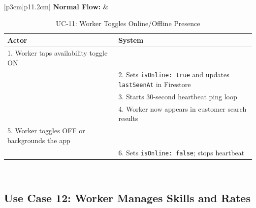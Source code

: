 {\small
\renewcommand{\arraystretch}{1.05}
\begin{table}[H]
\centering
\begin{tabular}{|p{3cm}|p{11.2cm}|}
\hline
\textbf{Normal Flow:} &
\begin{tabular}[t]{|p{5.4cm}|p{5.4cm}|}
\hline
\textbf{Actor} & \textbf{System} \\ \hline
1. Worker taps availability toggle ON & \\ \hline
 & 2. Sets \texttt{isOnline: true} and updates \texttt{lastSeenAt} in Firestore \\ \hline
 & 3. Starts 30-second heartbeat ping loop \\ \hline
 & 4. Worker now appears in customer search results \\ \hline
5. Worker toggles OFF or backgrounds the app & \\ \hline
 & 6. Sets \texttt{isOnline: false}; stops heartbeat \\ \hline
\end{tabular} \\ \hline
\end{tabular}
\caption{UC-11: Worker Toggles Online/Offline Presence}
\end{table}
}

\newpage

\subsection*{Use Case 12: Worker Manages Skills and Rates}

